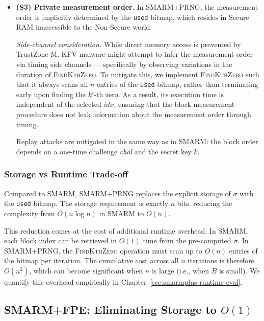 \documentclass[a4paper,10pt]{article}
\begin{document}
{\begin{itemize}
    \item \textbf{(S3) Private measurement order.} 
    In SMARM+PRNG, the measurement order is 
    implicitly determined by the \texttt{used} bitmap, which 
    resides in Secure RAM inaccessible to the Non-Secure world. 
    
    \emph{Side-channel consideration.} While direct memory 
    access is prevented by TrustZone-M, KFV malware might attempt 
    to infer the measurement order via timing side channels — 
    specifically by observing variations in the duration of 
    \textsc{FindKthZero}. To mitigate this, we implement 
    \textsc{FindKthZero} such that it always scans all $n$ 
    entries of the \texttt{used} bitmap, rather than terminating 
    early upon finding the $k'$-th zero. As a result, its 
    execution time is independent of the selected $\mathit{idx}$, 
    ensuring that the block measurement procedure does not leak 
    information about the measurement order through timing.
    
    Replay attacks are mitigated in the same way as in SMARM: 
    the block order depends on a one-time challenge \textit{chal} 
    and the secret key $k$.
\end{itemize}

\subsubsection{Storage vs Runtime Trade-off}

Compared to SMARM, SMARM+PRNG replaces the explicit 
storage of $\sigma$ with the \texttt{used} bitmap. The storage 
requirement is exactly $n$ bits, reducing the complexity from 
$O(n \log n)$ in SMARM to $O(n)$.

This reduction comes at the cost of additional runtime overhead. 
In SMARM, each block index can be retrieved in $O(1)$ time from 
the pre-computed $\sigma$. In SMARM+PRNG, the 
\textsc{FindKthZero} operation must scan up to $O(n)$ entries 
of the bitmap per iteration. The cumulative cost across all $n$ 
iterations is therefore $O(n^2)$, which can become significant 
when $n$ is large (i.e., when $B$ is small). We quantify this 
overhead empirically in 
Chapter~\ref{sec:smarmplus-runtime-eval}.

\subsection{SMARM+FPE: Eliminating Storage to $O(1)$}
\label{sec:smarmplus-fpe}

}
\end{document}
